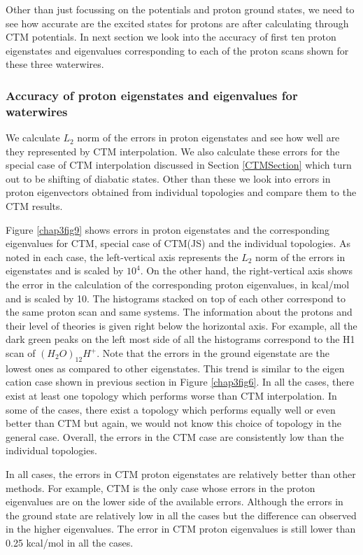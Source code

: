 Other than just focussing on the potentials and proton ground states, we need to see how accurate are the
excited states for protons are after calculating through CTM potentials. In next section we look into the
accuracy of first ten proton eigenstates and eigenvalues corresponding to each of the proton scans shown
for these three waterwires.

\subsubsection{Accuracy of proton eigenstates and eigenvalues for waterwires}
We calculate $L_{2}$ norm of the errors in proton eigenstates and see how well are they
represented by CTM interpolation. We also calculate these errors for the special case of CTM interpolation
discussed in Section \ref{CTMSection} which turn out to be shifting of diabatic states. Other than these we
look into errors in proton eigenvectors obtained from individual topologies and compare them to the CTM
results.

Figure \ref{chap3fig9} shows errors in proton eigenstates and the corresponding eigenvalues for CTM,
special case of CTM(JS) and the individual topologies. As noted in each case, the left-vertical axis
represents the $L_{2}$ norm of the errors in eigenstates and is scaled by $10^{4}$. On the other hand,
the right-vertical axis shows the error in the calculation of the corresponding proton eigenvalues, in
kcal/mol and is scaled by 10. The histograms stacked on top of each other correspond to the same proton
scan and same systems. The information about the protons and their level of theories is given right
below the horizontal axis. For example, all the dark green peaks on the left most side of all the histograms
correspond to the H1 scan of $(H_{2}O)_{12}H^+$. Note that the errors in the ground eigenstate are the lowest
ones as compared to other eigenstates. This trend is similar to the eigen cation case shown in previous section
in Figure \ref{chap3fig6}. In all the cases, there exist at least one topology which performs worse than CTM
interpolation. In some of the cases, there exist a topology which performs equally well or even better than
CTM but again, we would not know this choice of topology in the general case. Overall, the errors in the CTM
case are consistently low than the individual topologies.

In all cases, the errors in CTM proton eigenstates are relatively better than other methods. For example,
CTM is the only case whose errors in the proton eigenvalues are on the lower side of the available errors.
Although the errors in the ground state are relatively low in all the cases but the difference can observed
in the higher eigenvalues. The error in CTM proton eigenvalues is still lower than 0.25 kcal/mol in all the
cases.

